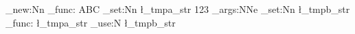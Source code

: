 \documentclass{article}
\begin{document}
\ExplSyntaxOn
\cs_new:Nn \my_func: { ABC }
\str_set:Nn \l_tmpa_str { 123 }
\exp_args:NNe \str_set:Nn \l_tmpb_str { \my_func: \l_tmpa_str }
\str_use:N \l_tmpb_str
\ExplSyntaxOff
\end{document}
